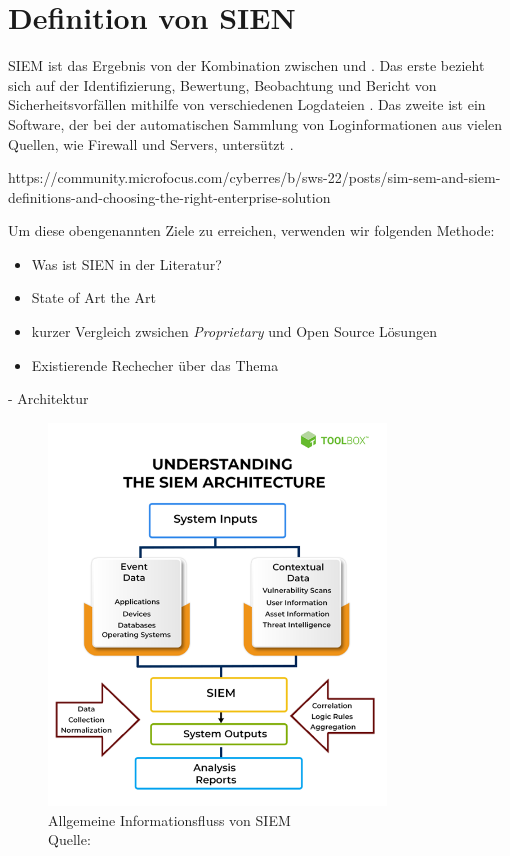 \section{Definition von SIEN}

\gls{SIEM} ist das Ergebnis von der Kombination zwischen  und  \citep{Dorigo_SIEM}. Das erste bezieht sich auf der Identifizierung, Bewertung, Beobachtung und Bericht von Sicherheitsvorfällen mithilfe von verschiedenen Logdateien \citep{techopedia_SEM}. Das zweite ist ein Software, der bei der automatischen Sammlung von Loginformationen aus vielen Quellen, wie Firewall und Servers, untersützt \cite{techopedia_SIM}. 

https://community.microfocus.com/cyberres/b/sws-22/posts/sim-sem-and-siem-definitions-and-choosing-the-right-enterprise-solution



Um diese obengenannten Ziele zu erreichen, verwenden wir folgenden Methode:

\begin{itemize}[noitemsep]
   \item Was ist SIEN in der Literatur?
   \item State of Art the Art
   \item kurzer Vergleich zwsichen \textit{\gls{Proprietary}} und \gls{Open Source} Lösungen
   \item Existierende Rechecher über das Thema
\end{itemize}


- Architektur %
\begin{figure}[H]
   \centering
   \includegraphics[width=0.8\textwidth]{assets/2_p1.png}
   \caption{Allgemeine Informationsfluss von \gls{SIEM} \\Quelle: \citep{Mohanan_What} }
   \centering
\end{figure}

